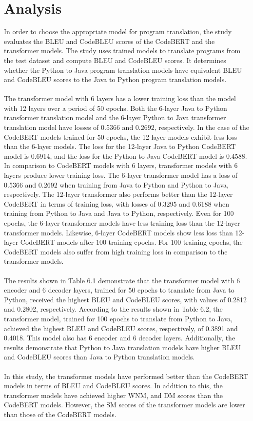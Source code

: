 \section{Analysis}
In order to choose the appropriate model for program translation, the study evaluates the BLEU and CodeBLEU scores of the CodeBERT and the transformer models. The study uses trained models to translate programs from the test dataset and compute BLEU and CodeBLEU scores. It determines whether the Python to Java program translation models have equivalent BLEU and CodeBLEU scores to the Java to Python program translation models.
\\\\
The transformer model with 6 layers has a lower training loss than the model with 12 layers over a period of 50 epochs. Both the 6-layer Java to Python transformer translation model and the 6-layer Python to Java transformer translation model have losses of 0.5366 and 0.2692, respectively. In the case of the CodeBERT models trained for 50 epochs, the 12-layer models exhibit less loss than the 6-layer models. The loss for the 12-layer Java to Python CodeBERT model is 0.6914, and the loss for the Python to Java CodeBERT model is 0.4588. In comparison to CodeBERT models with 6 layers, transformer models with 6 layers produce lower training loss. The 6-layer transformer model has a loss of 0.5366 and 0.2692 when training from Java to Python and Python to Java, respectively. The 12-layer transformer also performs better than the 12-layer CodeBERT in terms of training loss, with losses of 0.3295 and 0.6188 when training from Python to Java and Java to Python, respectively. Even for 100 epochs, the 6-layer transformer models have less training loss than the 12-layer transformer models. Likewise, 6-layer CodeBERT models show less loss than 12-layer CodeBERT models after 100 training epochs. For 100 training epochs, the CodeBERT models also suffer from high training loss in comparison to the transformer models.
\\\\
The results shown in Table 6.1 demonstrate that the transformer model with 6 encoder and 6 decoder layers, trained for 50 epochs to translate from Java to Python, received the highest BLEU and CodeBLEU scores, with values of 0.2812 and 0.2802, respectively. According to the results shown in Table 6.2, the transformer model, trained for 100 epochs to translate from Python to Java, achieved the highest BLEU and CodeBLEU scores, respectively, of 0.3891 and 0.4018. This model also has 6 encoder and 6 decoder layers. Additionally, the results demonstrate that Python to Java translation models have higher BLEU and CodeBLEU scores than Java to Python translation models.
\\\\
In this study, the transformer models have performed better than the CodeBERT models in terms of BLEU and CodeBLEU scores. In addition to this, the transformer models have achieved higher WNM, and DM scores than the CodeBERT models. However, the SM scores of the transformer models are lower than those of the CodeBERT models.






